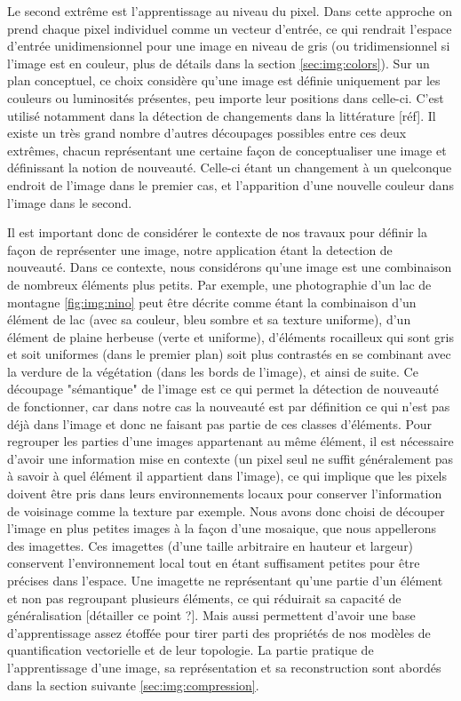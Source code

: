 	Le second extrême est l'apprentissage au niveau du pixel. Dans cette approche on prend chaque pixel individuel comme un vecteur d'entrée, ce qui rendrait l'espace d'entrée unidimensionnel pour une image en niveau de gris (ou tridimensionnel si l'image est en couleur, plus de détails dans la section \ref{sec:img:colors}). Sur un plan conceptuel, ce choix considère qu'une image est définie uniquement par les couleurs ou luminosités présentes, peu importe leur positions dans celle-ci. C'est utilisé notamment dans la détection de changements dans la littérature [réf]. Il existe un très grand nombre d'autres découpages possibles entre ces deux extrêmes, chacun représentant une certaine façon de conceptualiser une image et définissant la notion de nouveauté. Celle-ci étant un changement à un quelconque endroit de l'image dans le premier cas, et l'apparition d'une nouvelle couleur dans l'image dans le second.

	Il est important donc de considérer le contexte de nos travaux pour définir la façon de représenter une image, notre application étant la detection de nouveauté. Dans ce contexte, nous considérons qu'une image est une combinaison de nombreux éléments plus petits. Par exemple, une photographie d'un lac de montagne \ref{fig:img:nino} peut être décrite comme étant la combinaison d'un élément de lac (avec sa couleur, bleu sombre et sa texture uniforme), d'un élément de plaine herbeuse (verte et uniforme), d'éléments rocailleux qui sont gris et soit uniformes (dans le premier plan) soit plus contrastés en se combinant avec la verdure de la végétation (dans les bords de l'image), et ainsi de suite. Ce découpage "sémantique" de l'image est ce qui permet la détection de nouveauté  de fonctionner, car dans notre cas la nouveauté est par définition ce qui n'est pas déjà dans l'image et donc ne faisant pas partie de ces classes d'éléments. Pour regrouper les parties d'une images appartenant au même élément, il est nécessaire d'avoir une information mise en contexte (un pixel seul ne suffit généralement pas à savoir à quel élément il appartient dans l'image), ce qui implique que les pixels doivent être pris dans leurs environnements locaux pour conserver l'information de voisinage comme la texture par exemple. Nous avons donc choisi de découper l'image en plus petites images à la façon d'une mosaique, que nous appellerons des imagettes. Ces imagettes (d'une taille arbitraire en hauteur et largeur) conservent l'environnement local tout en étant suffisament petites pour être précises dans l'espace. Une imagette ne représentant qu'une partie d'un élément et non pas regroupant plusieurs éléments, ce qui réduirait sa capacité de généralisation [détailler ce point ?]. Mais aussi permettent d'avoir une base d'apprentissage assez étoffée pour tirer parti des propriétés de nos modèles de quantification vectorielle et de leur topologie. La partie pratique de l'apprentissage d'une image, sa représentation et sa reconstruction sont abordés dans la section suivante \ref{sec:img:compression}.



